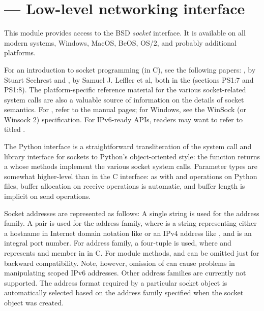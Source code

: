 \section{ ---
         Low-level networking interface}



This module provides access to the BSD \emph{socket} interface.
It is available on all modern \UNIX{} systems, Windows, MacOS, BeOS,
OS/2, and probably additional platforms.  

For an introduction to socket programming (in C), see the following
papers: , by Stuart Sechrest and , by Samuel J.  Leffler et al,
both in the 
(sections PS1:7 and PS1:8).  The platform-specific reference material
for the various socket-related system calls are also a valuable source
of information on the details of socket semantics.  For \UNIX, refer
to the manual pages; for Windows, see the WinSock (or Winsock 2)
specification.
For IPv6-ready APIs, readers may want to refer to  titled
.

The Python interface is a straightforward transliteration of the
\UNIX{} system call and library interface for sockets to Python's
object-oriented style: the  function returns a
 whose methods implement the
various socket system calls.  Parameter types are somewhat
higher-level than in the C interface: as with  and
 operations on Python files, buffer allocation on
receive operations is automatic, and buffer length is implicit on send
operations.

Socket addresses are represented as follows:
A single string is used for the  address family.
A pair  is used for the
 address family, where  is a string
representing either a hostname in Internet domain notation like
 or an IPv4 address like ,
and  is an integral port number.
For  address family, a four-tuple
 is
used, where  and  represents
 and  member in
 in C.
For  module methods,  and 
can be omitted just for backward compatibility. Note, however,
omission of  can cause problems in manipulating scoped
IPv6 addresses. Other address families are currently not supported.
The address format required by a particular socket object is
automatically selected based on the address family specified when the
socket object was created.

